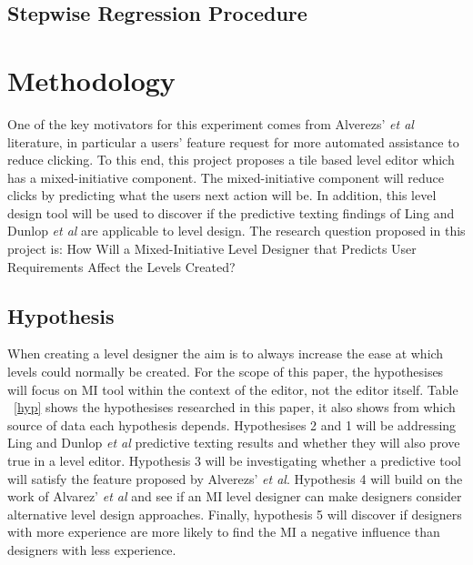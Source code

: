 \documentclass[journal]{IEEEtran}
\begin{document}
\subsection{Stepwise Regression Procedure}

\section{Methodology}
One of the key motivators for this experiment comes from Alverezs' \textit{et al}\cite{alvarez2018fostering} literature, in particular a users' feature request for more automated assistance to reduce clicking. To this end, this project proposes a tile based level editor which has a mixed-initiative component. The mixed-initiative component will reduce clicks by predicting what the users next action will be. In addition, this level design tool will be used to discover if the predictive texting findings of Ling \cite{ling2005length}  and Dunlop \textit{et al}\cite{dunlop2000predictive} are applicable to level design. The research question proposed in this project is: How Will a Mixed-Initiative Level Designer that Predicts User Requirements Affect the Levels Created? 

\subsection{Hypothesis}\label{hypothesis}
When creating a level designer the aim is to always increase the ease at which levels could normally be created. For the scope of this paper, the hypothesises will focus on MI tool within the context of the editor, not the editor itself. Table ~\ref{hyp} shows the hypothesises researched in this paper, it also shows from which source of data each hypothesis depends. Hypothesises 2 and 1 will be addressing  Ling \cite{ling2005length}  and Dunlop \textit{et al}\cite{dunlop2000predictive} predictive texting results and whether they will also prove true in a level editor. Hypothesis 3 will be investigating whether a predictive tool will satisfy the feature proposed by  Alverezs' \textit{et al}\cite{alvarez2018fostering}. Hypothesis 4 will build on the work of  Alvarez' \textit{et al}\cite{alvarez2018fostering} and see if an MI level designer can make designers consider alternative level design approaches. Finally, hypothesis 5 will discover if designers with more experience are more likely to find the MI a negative influence than designers with less experience.
\end{document}
